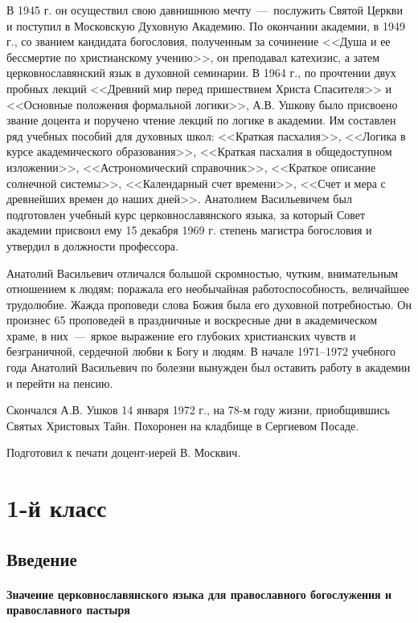 \documentclass[11pt,a4paper,oneside]{memoir}
\begin{document}
    В 1945 г. он осуществил свою давнишнюю мечту~---~послужить Святой Церкви и поступил в Московскую Духовную Академию. По окончании академии, в 1949 г., со званием кандидата богословия, полученным за сочинение <<Душа и ее бессмертие по христианскому учению>>, он преподавал катехизис, а затем церковнославянский язык в духовной семинарии. В 1964 г., по прочтении двух пробных лекций <<Древний мир перед пришествием Христа Спасителя>> и <<Основные положения формальной логики>>, А.В. Ушкову было присвоено звание доцента и поручено чтение лекций по логике в академии. Им составлен ряд учебных пособий для духовных школ: <<Краткая пасхалия>>, <<Логика в курсе академического образования>>, <<Краткая пасхалия в общедоступном изложении>>, <<Астрономический справочник>>, <<Краткое описание солнечной системы>>, <<Календарный счет времени>>, <<Счет и мера с древнейших времен до наших дней>>. Анатолием Васильевичем был подготовлен учебный курс церковнославянского языка, за который Совет академии присвоил ему 15 декабря 1969 г. степень магистра богословия и утвердил в должности профессора.
    
    Анатолий Васильевич отличался большой скромностью, чутким, внимательным отношением к людям; поражала его необычайная работоспособность, величайшее трудолюбие. Жажда проповеди слова Божия была его духовной потребностью. Он произнес 65 проповедей в праздничные и воскресные дни в академическом храме, в них~---~яркое выражение его глубоких христианских чувств и безграничной, сердечной любви к Богу и людям. В начале 1971--1972 учебного года Анатолий Васильевич по болезни вынужден был оставить работу в академии и перейти на пенсию.
    
    Скончался А.В. Ушков 14 января 1972 г., на 78-м году жизни, приобщившись Святых Христовых Тайн. Похоронен на кладбище в Сергиевом Посаде.
    
    \medskip
    Подготовил к печати доцент-иерей В. Москвич.
    
    \chapter*{1-й класс}
    \label{ch:firstgrade}
        \section*{Введение}
        \label{sec:intro}
                \subsubsection[Значение церковнославянского языка]{Значение церковнославянского языка для православного богослужения и православного пастыря}
                
\end{document}
